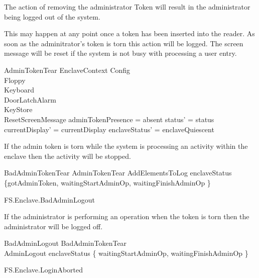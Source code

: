 The action of removing the administrator Token will result in the
administrator being logged out of the system.

This may happen at any point once a token has been inserted into the
reader. As soon as the adminitrator's token is torn this action will
be logged. The screen message will be reset if the system is not busy
with processing a user entry.

\begin{schema}{AdminTokenTear}
         EnclaveContext
\also
        \Xi Config
\\      \Xi Floppy
\\      \Xi Keyboard
\\      \Xi DoorLatchAlarm
\\      \Xi KeyStore
\\      ResetScreenMessage
\where
        adminTokenPresence = absent
\also   
        status' = status
\\      currentDisplay' = currentDisplay
\also
        enclaveStatus' = enclaveQuiescent
\end{schema}

If the admin token is torn while the system is processing an activity
within the enclave then the activity will be stopped.

\begin{schema}{BadAdminTokenTear} 
        AdminTokenTear
\also
        AddElementsToLog
\where
        enclaveStatus \in \{gotAdminToken, waitingStartAdminOp, waitingFinishAdminOp \}
\end{schema}

\begin{traceunit}{FS.Enclave.BadAdminLogout}
\end{traceunit}

If the administrator is performing an operation when the token is torn
then the administrator will be logged off.

\begin{schema}{BadAdminLogout}
        BadAdminTokenTear
\\      AdminLogout
\where
        enclaveStatus \in \{ waitingStartAdminOp, waitingFinishAdminOp
        \}
\end{schema}


\begin{traceunit}{FS.Enclave.LoginAborted}
\end{traceunit}

